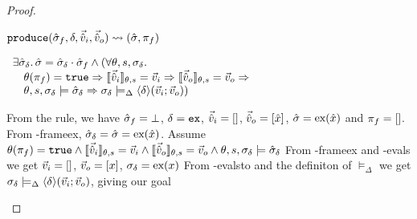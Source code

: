 \begin{proof}

\pfassume \begin{hypvlist}
 $\texttt{produce}(\hat{\sigma}_f,\delta,\vec{\hat{v}}_i,\vec{\hat{v}}_o)\rightsquigarrow (\hat{\sigma}, \pi_f)$
\end{hypvlist}
\pfprove \begin{goalvlist}
 $\begin{array}{l}
\exists \hat{\sigma}_\delta\ldotp \hat{\sigma}=\hat{\sigma}_\delta\cdot\hat{\sigma}_f \land (\forall\theta,s,\sigma_\delta\ldotp\\
\quad \theta(\pi_f)=\texttt{true} \Rightarrow \llbracket\vec{\hat{v}}_i\rrbracket_{\theta,s}=\vec{v}_i \Rightarrow \llbracket\vec{\hat{v}}_o\rrbracket_{\theta,s}=\vec{v}_o \Rightarrow \\
\quad \theta,s,\sigma_\delta \models \hat{\sigma}_\delta \Rightarrow \sigma_\delta\models_\Delta\left<\delta\right>\!(\vec{v}_i;\vec{v}_o))
\end{array}$
\end{goalvlist}
\begin{hypvlist}
 From the \produce{} rule, we have $\hat{\sigma}_f=\bot$, $\delta=\texttt{ex}$, $\vec{\hat{v}}_i=[]$, $\vec{\hat{v}}_o=[\hat{x}]$, $\hat{\sigma}=\text{ex}(\hat{x})$ and $\pi_f=[]$.
 From \hyp{frameex}, $\hat{\sigma}_\delta=\hat{\sigma}=\text{ex}(\hat{x})$.
 Assume $\theta(\pi_f)=\texttt{true} \land \llbracket\vec{\hat{v}}_i\rrbracket_{\theta,s}=\vec{v}_i \land \llbracket\vec{\hat{v}}_o\rrbracket_{\theta,s}=\vec{v}_o \land \theta,s,\sigma_\delta\models\hat{\sigma}_\delta$
 From \hyp{frameex} and \hyp{evals} we get $\vec{v}_i=[]$, $\vec{v}_o=[x]$, $\sigma_\delta=\text{ex}(x)$
 From \hyp{evalsto} and the definiton of $\models_\Delta$ we get $\sigma_\delta\models_\Delta\left<\delta\right>\!(\vec{v}_i;\vec{v}_o)$, giving our goal 
\end{hypvlist}



\end{proof}
